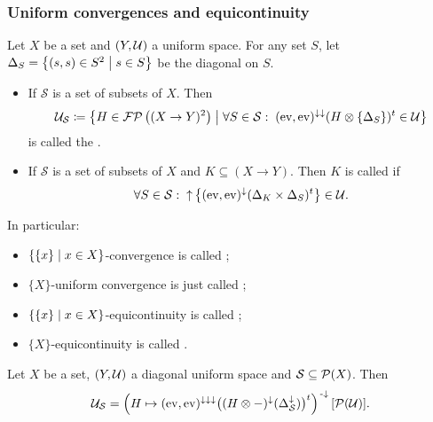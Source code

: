\subsubsection{Uniform convergences and equicontinuity}
\begin{definition}
Let $X$ be a set and $\left( Y, \mathcal{U} \right)$ a  uniform space. For any set $S$, let $\Delta_S = \left\{ (s,s)\in S^2 \;\middle|\; s\in S \right\}$ be the diagonal on $S$.
\begin{itemize}
\item If $\mathcal{S}$ is a set of subsets of $X$. Then
\[ \mathcal{U}_\mathcal{S} \coloneqq \left\{ H\in \operatorname{\mathcal{FP}}\big((X\to Y)^2\big) \;\middle|\; \forall S\in \mathcal{S}:\; (\operatorname{ev}, \operatorname{ev})^{\downarrow\downarrow}(H\otimes \{\Delta_S\})^t \in \mathcal{U} \right\} \]
is called the .
\item If $\mathcal{S}$ is a set of subsets of $X$ and $K\subseteq (X\to Y)$. Then $K$ is called  if
\[ \forall S\in \mathcal{S}:\; \operatorname{\uparrow}\big\{(\operatorname{ev}, \operatorname{ev})^\downarrow(\Delta_K\times \Delta_S)^t\big\}\in \mathcal{U}. \]
\end{itemize}
In particular:
\begin{itemize}
\item $\left\{ \{x\} \;\middle|\; x\in X \right\}$-convergence is called ;
\item $\{X\}$-uniform convergence is just called ;
\item $\left\{ \{x\} \;\middle|\; x\in X \right\}$-equicontinuity is called ;
\item $\{X\}$-equicontinuity is called .
\end{itemize}
\end{definition}

\begin{lemma}
Let $X$ be a set, $\left( Y, \mathcal{U} \right)$ a diagonal uniform space and $\mathcal{S} \subseteq \operatorname{\mathcal{P}}(X)$. Then
\[ \mathcal{U}_\mathcal{S} = \left(H\mapsto (\operatorname{ev}, \operatorname{ev})^{\downarrow\downarrow\downarrow}\big((H\otimes -)^\downarrow(\Delta^\downarrow_\mathcal{S})\big)^t\right)^{\text{\hspace{0.15em}-}\downarrow}[\operatorname{\mathcal{P}}(\mathcal{U})]. \]
\end{lemma}

